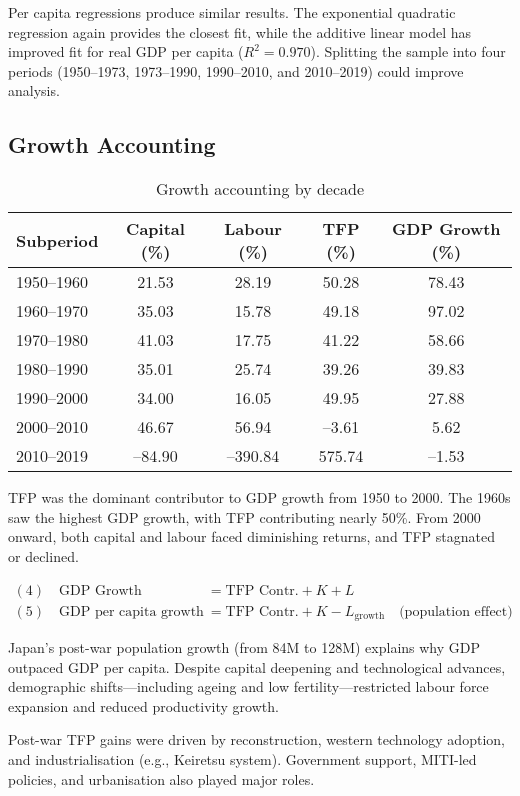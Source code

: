 Per capita regressions produce similar results. The exponential quadratic regression again provides the closest fit, while the additive linear model has improved fit for real GDP per capita ($R^2 = 0.970$). Splitting the sample into four periods (1950--1973, 1973--1990, 1990--2010, and 2010--2019) could improve analysis.

\subsection*{Growth Accounting}
\begin{table}[h!]
\centering
\caption{Growth accounting by decade}
\begin{tabular}{lcccc}
\toprule
Subperiod & Capital (\%) & Labour (\%) & TFP (\%) & GDP Growth (\%) \\
\midrule
1950--1960 & 21.53 & 28.19 & 50.28 & 78.43 \\
1960--1970 & 35.03 & 15.78 & 49.18 & 97.02 \\
1970--1980 & 41.03 & 17.75 & 41.22 & 58.66 \\
1980--1990 & 35.01 & 25.74 & 39.26 & 39.83 \\
1990--2000 & 34.00 & 16.05 & 49.95 & 27.88 \\
2000--2010 & 46.67 & 56.94 & --3.61 & 5.62 \\
2010--2019 & --84.90 & --390.84 & 575.74 & --1.53 \\
\bottomrule
\end{tabular}
\end{table}

TFP was the dominant contributor to GDP growth from 1950 to 2000. The 1960s saw the highest GDP growth, with TFP contributing nearly 50\%. From 2000 onward, both capital and labour faced diminishing returns, and TFP stagnated or declined.

\begin{align*}
(4)\quad \text{GDP Growth} &= \text{TFP Contr.} + K + L \\
(5)\quad \text{GDP per capita growth} &= \text{TFP Contr.} + K - L_{\text{growth}} \quad \text{(population effect)}
\end{align*}

Japan's post-war population growth (from 84M to 128M) explains why GDP outpaced GDP per capita. Despite capital deepening and technological advances, demographic shifts—including ageing and low fertility—restricted labour force expansion and reduced productivity growth.

Post-war TFP gains were driven by reconstruction, western technology adoption, and industrialisation (e.g., Keiretsu system). Government support, MITI-led policies, and urbanisation also played major roles.


